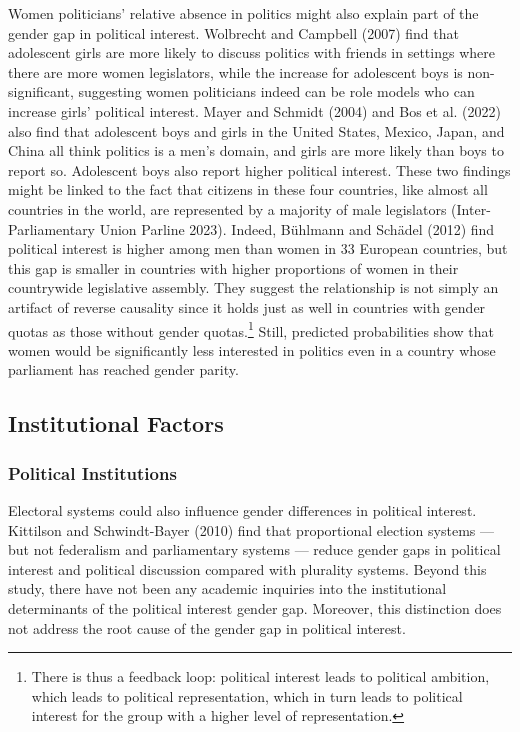 \documentclass[
  letterpaper,
  DIV=11,
  numbers=noendperiod]{scrreprt}
\begin{document}
Women politicians' relative absence in politics might also explain part
of the gender gap in political interest. Wolbrecht and Campbell (2007)
find that adolescent girls are more likely to discuss politics with
friends in settings where there are more women legislators, while the
increase for adolescent boys is non-significant, suggesting women
politicians indeed can be role models who can increase girls' political
interest. Mayer and Schmidt (2004) and Bos et al. (2022) also find that
adolescent boys and girls in the United States, Mexico, Japan, and China
all think politics is a men's domain, and girls are more likely than
boys to report so. Adolescent boys also report higher political
interest. These two findings might be linked to the fact that citizens
in these four countries, like almost all countries in the world, are
represented by a majority of male legislators (Inter-Parliamentary Union
Parline 2023). Indeed, Bühlmann and Schädel (2012) find political
interest is higher among men than women in 33 European countries, but
this gap is smaller in countries with higher proportions of women in
their countrywide legislative assembly. They suggest the relationship is
not simply an artifact of reverse causality since it holds just as well
in countries with gender quotas as those without gender
quotas.\footnote{There is thus a feedback loop: political interest leads
  to political ambition, which leads to political representation, which
  in turn leads to political interest for the group with a higher level
  of representation.} Still, predicted probabilities show that women
would be significantly less interested in politics even in a country
whose parliament has reached gender parity.

\hypertarget{institutional-factors}{%
\subsection{Institutional Factors}\label{institutional-factors}}

\hypertarget{political-institutions}{%
\subsubsection{Political Institutions}\label{political-institutions}}

Electoral systems could also influence gender differences in political
interest. Kittilson and Schwindt-Bayer (2010) find that proportional
election systems --- but not federalism and parliamentary systems ---
reduce gender gaps in political interest and political discussion
compared with plurality systems. Beyond this study, there have not been
any academic inquiries into the institutional determinants of the
political interest gender gap. Moreover, this distinction does not
address the root cause of the gender gap in political interest.
\end{document}
